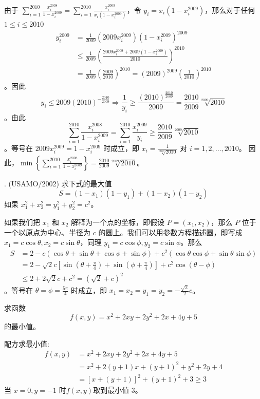 \begin{questions}
\begin{solution}
由于 $\sum_{i=1}^{2010} \frac{x_i^{2008}}{1 - x_i^{2009}} = \sum_{i=1}^{2010} \frac{x_i^{2009}}{x_i \left(1 - x_i^{2009}\right)}$，令 $y_i = x_i \left(1 - x_i^{2009}\right)$，那么对于任何 $1 \le i \le 2010$
\begin{align*}
y_i^{2009} &= \frac{1}{2009} \left(2009x_i^{2009}\right) \left(1 - x_i^{2009}\right)^{2009} \\
&\le \frac{1}{2009} \left(\frac{2009x_i^{2009} + 2009 \left(1 - x_i^{2009}\right)}{2010}\right)^{2010} \\
&= \frac{1}{2009} \left(\frac{2009}{2010}\right)^{2010} = (2009)^{2009} \left(\frac{1}{2010}\right)^{2010}
\end{align*}
。因此
\[
y_i \le 2009(2010)^{-\frac{2010}{2009}} \Rightarrow \frac{1}{y_i} \ge \frac{(2010)^{\frac{2010}{2009}}}{2009} = \frac{2010}{2009} \sqrt[2009]{2010}
\]
。由此
\[
\sum_{i=1}^{2010} \frac{x_i^{2008}}{1 - x_i^{2009}} = \sum_{i=1}^{2010} \frac{x_i^{2009}}{y_i} \ge \frac{2010}{2009} \sqrt[2009]{2010}
\]
。等号在 $2009x_i^{2009} = 1 - x_i^{2009}$ 时成立，即 $x_i = \frac{1}{\sqrt[2009]{2010}}$ 对 $i = 1, 2, \dots, 2010$。
因此，$\min \left\{ \sum_{i=1}^{2010} \frac{x_i^{2008}}{1 - x_i^{2009}} \right\} = \frac{2010}{2009} \sqrt[2009]{2010}$。
\end{solution}

. (USAMO/2002) 求下式的最大值
\[
S = (1 - x_1)(1 - y_1) + (1 - x_2)(1 - y_2)
\]
如果 $x_1^2 + x_2^2 = y_1^2 + y_2^2 = c^2$。

\begin{solution}
如果我们把 $x_1$ 和 $x_2$ 解释为一个点的坐标，即假设 $P = (x_1, x_2)$，那么 $P$ 位于一个以原点为中心、半径为 $c$ 的圆上。我们可以用参数方程描述圆，即写成 $x_1 = c \cos \theta, x_2 = c \sin \theta$，同理 $y_1 = c \cos \phi, y_2 = c \sin \phi$。那么
\begin{align*}
S &= 2 - c(\cos \theta + \sin \theta + \cos \phi + \sin \phi) + c^2(\cos \theta \cos \phi + \sin \theta \sin \phi) \\
&= 2 - \sqrt{2}c \left[\sin \left(\theta + \frac{\pi}{4}\right) + \sin \left(\phi + \frac{\pi}{4}\right)\right] + c^2 \cos (\theta - \phi) \\
&\le 2 + 2\sqrt{2}c + c^2 = (\sqrt{2} + c)^2
\end{align*}
。等号在 $\theta = \phi = \frac{5\pi}{4}$ 时成立，即 $x_1 = x_2 = y_1 = y_2 = -\frac{\sqrt{2}}{2}c$。
\end{solution}

    \question 求函数 $$f(x,y) = x^2 + 2xy + 2y^2 + 2x + 4y + 5$$ 的最小值。
    \begin{solution}
        配方求最小值:
        \begin{align*}
        f(x,y) &= x^2 + 2xy + 2y^2 + 2x + 4y + 5 \\
        &= x^2 + 2(y+1)x + (y+1)^2 + y^2 + 2y + 4 \\
        &= [x+(y+1)]^2 + (y+1)^2 + 3 \ge 3
        \end{align*}
        当 $x=0, y=-1$ 时$f(x,y)$取到最小值 $3$。
    \end{solution}
    

\end{questions}
